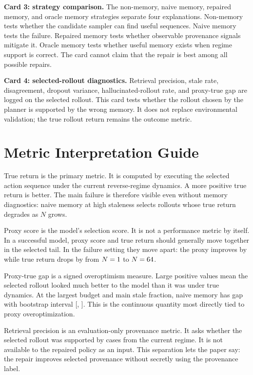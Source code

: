 \documentclass{article}
\begin{document}
\textbf{Card 3: strategy comparison.} The non-memory, naive memory, repaired
memory, and oracle memory strategies separate four explanations. Non-memory
tests whether the candidate sampler can find useful sequences. Naive memory
tests the failure. Repaired memory tests whether observable provenance signals
mitigate it. Oracle memory tests whether useful memory exists when regime
support is correct. The card cannot claim that the repair is best among all
possible repairs.

\textbf{Card 4: selected-rollout diagnostics.} Retrieval precision, stale
rate, disagreement, dropout variance, hallucinated-rollout rate, and proxy-true
gap are logged on the selected rollout. This card tests whether the rollout
chosen by the planner is supported by the wrong memory. It does not replace
environmental validation; the true rollout return remains the outcome metric.

\section{Metric Interpretation Guide}
\label{app:metric-guide}

True return is the primary metric. It is computed by executing the selected
action sequence under the current reverse-regime dynamics. A more positive
true return is better. The main failure is therefore visible even without
memory diagnostics: naive memory at high staleness selects rollouts whose true
return degrades as $N$ grows.

Proxy score is the model's selection score. It is not a performance metric by
itself. In a successful model, proxy score and true return should generally
move together in the selected tail. In the failure setting they move apart:
the proxy improves by \EvidenceNaiveDeltaProxy{} while true return drops by
\EvidenceNaiveDeltaTrue{} from $N=1{}$ to $N=64{}$.

Proxy-true gap is a signed overoptimism measure. Large positive values mean
the selected rollout looked much better to the model than it was under true
dynamics. At the largest budget and main stale fraction, naive memory has gap
\EvidenceNaiveMaxGap{} with bootstrap interval
[\EvidenceNaiveMaxGapCILow{}, \EvidenceNaiveMaxGapCIHigh{}]. This is the continuous
quantity most directly tied to proxy overoptimization.

Retrieval precision is an evaluation-only provenance metric. It asks whether
the selected rollout was supported by cases from the current regime. It is
not available to the repaired policy as an input. This separation lets the
paper say: the repair improves selected provenance without secretly using the
provenance label.
\end{document}
